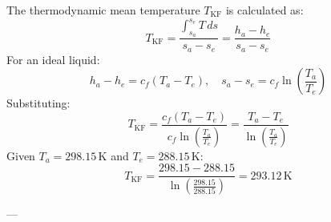 The thermodynamic mean temperature \( T_{\text{KF}} \) is calculated as:  
\[
T_{\text{KF}} = \frac{\int_{s_a}^{s_e} T \, ds}{s_a - s_e} = \frac{h_a - h_e}{s_a - s_e}
\]  
For an ideal liquid:  
\[
h_a - h_e = c_f \left( T_a - T_e \right), \quad s_a - s_e = c_f \ln \left( \frac{T_a}{T_e} \right)
\]  
Substituting:  
\[
T_{\text{KF}} = \frac{c_f \left( T_a - T_e \right)}{c_f \ln \left( \frac{T_a}{T_e} \right)} = \frac{T_a - T_e}{\ln \left( \frac{T_a}{T_e} \right)}
\]  
Given \( T_a = 298.15 \, \text{K} \) and \( T_e = 288.15 \, \text{K} \):  
\[
T_{\text{KF}} = \frac{298.15 - 288.15}{\ln \left( \frac{298.15}{288.15} \right)} = 293.12 \, \text{K}
\]  

---